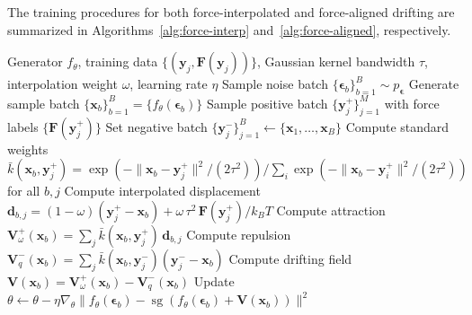 \documentclass[11pt]{article}
\newcommand{\bx}{\mathbf{x}}
\newcommand{\by}{\mathbf{y}}
\newcommand{\bV}{\mathbf{V}}
\newcommand{\bF}{\mathbf{F}}
\newcommand{\beps}{\boldsymbol{\epsilon}}
\newcommand{\kbar}{\bar{k}}
\newcommand{\sg}{\operatorname{sg}}
\newcommand{\kBT}{k_BT}
\begin{document}
The training procedures for both force-interpolated and force-aligned drifting are summarized in Algorithms~\ref{alg:force-interp} and~\ref{alg:force-aligned}, respectively.

\begin{algorithm}[t]
\caption{Force-Interpolated Drifting Training (Coordinate Space)}
\label{alg:force-interp}
\begin{algorithmic}[1]
\REQUIRE Generator $f_\theta$, training data $\{(\by_j, \bF(\by_j))\}$, Gaussian kernel bandwidth $\tau$, interpolation weight $\omega$, learning rate $\eta$
    \STATE Sample noise batch $\{\beps_b\}_{b=1}^B \sim p_{\beps}$
    \STATE Generate sample batch $\{\bx_b\}_{b=1}^B = \{f_\theta(\beps_b)\}$  
    \STATE Sample positive batch $\{\by_j^+\}_{j=1}^M$ with force labels $\{\bF(\by_j^+)\}$
    \STATE Set negative batch $\{\by_j^-\}_{j=1}^B \leftarrow \{\bx_1, \ldots, \bx_B\}$ 
    \STATE Compute standard weights $\kbar(\bx_b, \by_j^+) = \exp(-\|\bx_b-\by_j^+\|^2/(2\tau^2)) / \sum_i \exp(-\|\bx_b-\by_i^+\|^2/(2\tau^2))$ for all $b,j$
    \STATE Compute interpolated displacement $\mathbf{d}_{b,j} = (1-\omega)(\by_j^+ - \bx_b) + \omega\,\tau^2\,\bF(\by_j^+)/\kBT$
    \STATE Compute attraction $\bV_\omega^+(\bx_b) = \sum_j \kbar(\bx_b,\by_j^+)\,\mathbf{d}_{b,j}$
    \STATE Compute repulsion $\bV_q^-(\bx_b) = \sum_j \kbar(\bx_b,\by_j^-)(\by_j^- - \bx_b)$ 
    \STATE Compute drifting field $\bV(\bx_b) = \bV_\omega^+(\bx_b) - \bV_q^-(\bx_b)$
        \STATE Update $\theta \leftarrow \theta - \eta\nabla_\theta \|f_\theta(\beps_b) - \sg(f_\theta(\beps_b) + \bV(\bx_b))\|^2$
    \ENDFOR
\ENDWHILE
\end{algorithmic}
\end{algorithm}
\end{document}
